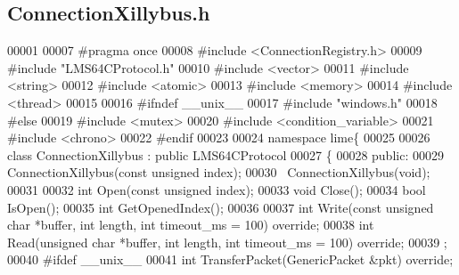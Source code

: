 \subsection{Connection\+Xillybus.\+h}
\label{ConnectionXillybus_8h_source}

\begin{DoxyCode}
00001 
00007 \textcolor{preprocessor}{#pragma once}
00008 \textcolor{preprocessor}{#include <ConnectionRegistry.h>}
00009 \textcolor{preprocessor}{#include "LMS64CProtocol.h"}
00010 \textcolor{preprocessor}{#include <vector>}
00011 \textcolor{preprocessor}{#include <string>}
00012 \textcolor{preprocessor}{#include <atomic>}
00013 \textcolor{preprocessor}{#include <memory>}
00014 \textcolor{preprocessor}{#include <thread>}
00015 
00016 \textcolor{preprocessor}{#ifndef \_\_unix\_\_}
00017 \textcolor{preprocessor}{#include "windows.h"}
00018 \textcolor{preprocessor}{#else}
00019 \textcolor{preprocessor}{#include <mutex>}
00020 \textcolor{preprocessor}{#include <condition\_variable>}
00021 \textcolor{preprocessor}{#include <chrono>}
00022 \textcolor{preprocessor}{#endif}
00023 
00024 \textcolor{keyword}{namespace }lime\{
00025 
00026 \textcolor{keyword}{class }ConnectionXillybus : \textcolor{keyword}{public} LMS64CProtocol
00027 \{
00028 \textcolor{keyword}{public}:
00029     ConnectionXillybus(\textcolor{keyword}{const} \textcolor{keywordtype}{unsigned} index);
00030     ~ConnectionXillybus(\textcolor{keywordtype}{void});
00031 
00032     \textcolor{keywordtype}{int} Open(\textcolor{keyword}{const} \textcolor{keywordtype}{unsigned} index);
00033     \textcolor{keywordtype}{void} Close();
00034     \textcolor{keywordtype}{bool} IsOpen();
00035     \textcolor{keywordtype}{int} GetOpenedIndex();
00036 
00037     \textcolor{keywordtype}{int} Write(\textcolor{keyword}{const} \textcolor{keywordtype}{unsigned} \textcolor{keywordtype}{char} *buffer, \textcolor{keywordtype}{int} length, \textcolor{keywordtype}{int} timeout_ms = 100) \textcolor{keyword}{override};
00038     \textcolor{keywordtype}{int} Read(\textcolor{keywordtype}{unsigned} \textcolor{keywordtype}{char} *buffer, \textcolor{keywordtype}{int} length, \textcolor{keywordtype}{int} timeout_ms = 100) \textcolor{keyword}{override};
00039 ;
00040 \textcolor{preprocessor}{#ifdef \_\_unix\_\_}
00041     \textcolor{keywordtype}{int} TransferPacket(GenericPacket &pkt) \textcolor{keyword}{override};

\end{DoxyCode}
